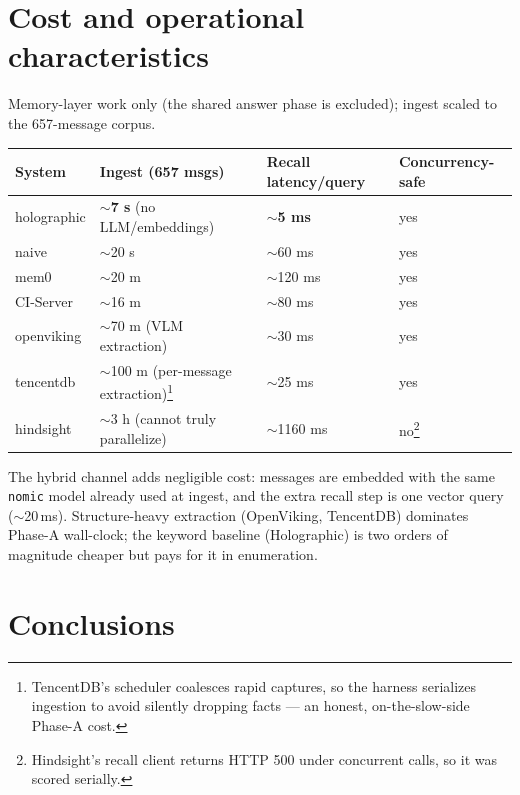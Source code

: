 \documentclass[11pt]{article}
\newcommand{\sapp}{$\sim$}            %
\newcommand{\sap}{$\sim$}             %
\newcommand{\best}[1]{\textbf{#1}}
\begin{document}
\section{Cost and operational characteristics}

Memory-layer work only (the shared answer phase is excluded); ingest scaled to the 657-message corpus.

\begin{table}[H]\centering\small
\begin{tabular}{llll}
\toprule
System & Ingest (657 msgs) & Recall latency/query & Concurrency-safe \\
\midrule
holographic & \best{\sapp7 s} (no LLM/embeddings) & \best{\sapp5 ms} & yes \\
naive       & \sapp20 s & \sapp60 ms & yes \\
mem0        & \sapp20 m & \sapp120 ms & yes \\
\rowcolor{ci!12} CI-Server & \sapp16 m & \sapp80 ms & yes \\
openviking  & \sapp70 m (VLM extraction) & \sap30 ms & yes \\
tencentdb   & \sapp100 m (per-message extraction)\footnote{TencentDB's scheduler coalesces rapid captures, so
the harness serializes ingestion to avoid silently dropping facts --- an honest, on-the-slow-side Phase-A
cost.} & \sap25 ms & yes \\
hindsight   & \sap3 h (cannot truly parallelize) & \sap1160 ms & no\footnote{Hindsight's recall client returns
HTTP 500 under concurrent calls, so it was scored serially.} \\
\bottomrule
\end{tabular}
\end{table}

\noindent The hybrid channel adds negligible cost: messages are embedded with the same \texttt{nomic} model
already used at ingest, and the extra recall step is one vector query (\sapp20\,ms). Structure-heavy extraction
(OpenViking, TencentDB) dominates Phase-A wall-clock; the keyword baseline (Holographic) is two orders of
magnitude cheaper but pays for it in enumeration.

\section{Conclusions}
\end{document}
